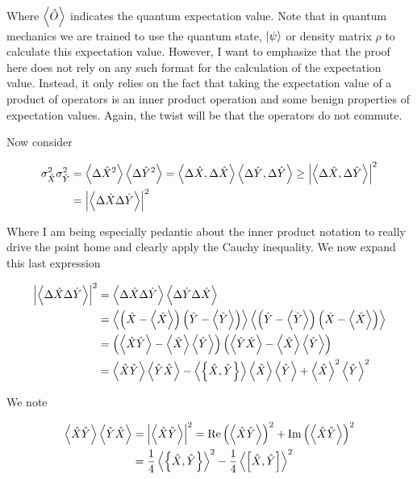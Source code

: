 \documentclass[12pt]{article}
\begin{document}
Where $\Braket{\hat{O}}$ indicates the quantum expectation value. Note that in quantum mechanics we are trained to use the quantum state, $\ket{\psi}$ or density matrix $\rho$ to calculate this expectation value. However, I want to emphasize that the proof here does not rely on any such format for the calculation of the expectation value. Instead, it only relies on the fact that taking the expectation value of a product of operators is an inner product operation and some benign properties of expectation values. Again, the twist will be that the operators do not commute.

Now consider

\begin{align}
\sigma_{\hat{X}}^2\sigma_{\hat{Y}}^2 &= \Braket{\Delta \hat{X}^2}\Braket{\Delta \hat{Y}^2} = \Braket{\Delta \hat{X},\Delta{\hat{X}}}\Braket{\Delta\hat{Y},\Delta\hat{Y}}\ge \left\lvert\Braket{\Delta\hat{X},\Delta\hat{Y}}\right\rvert^2\\
&=\left\lvert\Braket{\Delta\hat{X} \Delta \hat{Y}}\right\rvert^2
\end{align}

Where I am being especially pedantic about the inner product notation to really drive the point home and clearly apply the Cauchy inequality. We now expand this last expression

\begin{align}
\left \lvert \Braket{\Delta\hat{X} \Delta\hat{Y}} \right \rvert^2 &= \Braket{\Delta\hat{X} \Delta \hat{Y}} \Braket{\Delta\hat{Y} \Delta \hat{X}}\\
&= \Braket{\left(\hat{X} - \Braket{\hat{X}}\right)\left(\hat{Y}-\Braket{\hat{Y}}\right)}\Braket{\left(\hat{Y}-\Braket{\hat{Y}}\right)\left(\hat{X}-\Braket{\hat{X}}\right)}\\
&=\left(\Braket{\hat{X}\hat{Y}} - \Braket{\hat{X}}\Braket{\hat{Y}}\right)\left(\Braket{\hat{Y}\hat{X}} - \Braket{\hat{X}}\Braket{\hat{Y}}\right)\\
&= \Braket{\hat{X}\hat{Y}}\Braket{\hat{Y}\hat{X}} - \Braket{\left\{\hat{X},\hat{Y}\right\}}\Braket{\hat{X}}\Braket{\hat{Y}}+\Braket{\hat{X}}^2\Braket{\hat{Y}}^2
\end{align}

We note

\begin{align}
\Braket{\hat{X}\hat{Y}}\Braket{\hat{Y}\hat{X}} &= \left\lvert \Braket{\hat{X}\hat{Y}}\right\rvert^2 = \text{Re}\left(\Braket{\hat{X}\hat{Y}}\right)^2 + \text{Im}\left(\Braket{\hat{X}\hat{Y}}\right)^2\\
&= \frac{1}{4}\Braket{\left\{\hat{X}, \hat{Y}\right\}}^2 - \frac{1}{4}\Braket{\left[\hat{X}, \hat{Y}\right]}^2
\end{align}
\end{document}
